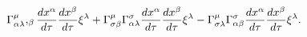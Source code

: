 \begin{equation}
\Gamma_{\alpha\lambda}^{\mu},_{\beta}\frac{dx^{\alpha}}{d\tau}\frac{%
dx^{\beta }}{d\tau}\xi^{\lambda}+\Gamma_{\sigma\beta}^{\mu}\Gamma_{\alpha%
\lambda }^{\sigma}\frac{dx^{\alpha}}{d\tau}\frac{dx^{\beta}}{d\tau}%
\xi^{\lambda }-\Gamma_{\sigma\lambda}^{\mu}\Gamma_{\alpha\beta}^{\sigma}%
\frac{dx^{\alpha}}{d\tau}\frac{dx^{\beta}}{d\tau}\xi^{\lambda}.  \label{23}
\end{equation}

